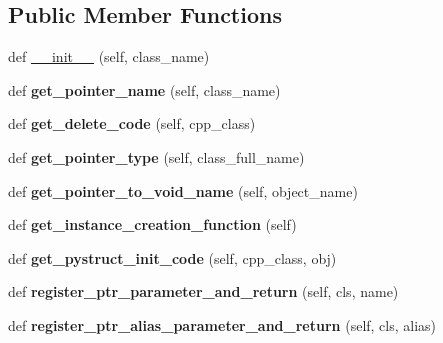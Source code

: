 \subsection*{Public Member Functions}
\begin{DoxyCompactItemize}
\item 
def \hyperlink{classns3__ptr_1_1Ns3PtrMemoryPolicy_aae8674f40d646f4e0a6ff68af5bce543}{\+\_\+\+\_\+init\+\_\+\+\_\+} (self, class\+\_\+name)
\item 
def {\bfseries get\+\_\+pointer\+\_\+name} (self, class\+\_\+name)\hypertarget{classns3__ptr_1_1Ns3PtrMemoryPolicy_a402dc87c812e80777602192e037169c4}{}\label{classns3__ptr_1_1Ns3PtrMemoryPolicy_a402dc87c812e80777602192e037169c4}

\item 
def {\bfseries get\+\_\+delete\+\_\+code} (self, cpp\+\_\+class)\hypertarget{classns3__ptr_1_1Ns3PtrMemoryPolicy_ad4ada9c119ce615fb9deaa1587802504}{}\label{classns3__ptr_1_1Ns3PtrMemoryPolicy_ad4ada9c119ce615fb9deaa1587802504}

\item 
def {\bfseries get\+\_\+pointer\+\_\+type} (self, class\+\_\+full\+\_\+name)\hypertarget{classns3__ptr_1_1Ns3PtrMemoryPolicy_a4878814a772ce27d3fbe36a3739153f9}{}\label{classns3__ptr_1_1Ns3PtrMemoryPolicy_a4878814a772ce27d3fbe36a3739153f9}

\item 
def {\bfseries get\+\_\+pointer\+\_\+to\+\_\+void\+\_\+name} (self, object\+\_\+name)\hypertarget{classns3__ptr_1_1Ns3PtrMemoryPolicy_a49c7e0334aa2233191cea6b12a11d20f}{}\label{classns3__ptr_1_1Ns3PtrMemoryPolicy_a49c7e0334aa2233191cea6b12a11d20f}

\item 
def {\bfseries get\+\_\+instance\+\_\+creation\+\_\+function} (self)\hypertarget{classns3__ptr_1_1Ns3PtrMemoryPolicy_ab9c903d63145409013a1c2cb0dda0ff7}{}\label{classns3__ptr_1_1Ns3PtrMemoryPolicy_ab9c903d63145409013a1c2cb0dda0ff7}

\item 
def {\bfseries get\+\_\+pystruct\+\_\+init\+\_\+code} (self, cpp\+\_\+class, obj)\hypertarget{classns3__ptr_1_1Ns3PtrMemoryPolicy_afaa224d0bb440100320fed71329b2f5b}{}\label{classns3__ptr_1_1Ns3PtrMemoryPolicy_afaa224d0bb440100320fed71329b2f5b}

\item 
def {\bfseries register\+\_\+ptr\+\_\+parameter\+\_\+and\+\_\+return} (self, cls, name)\hypertarget{classns3__ptr_1_1Ns3PtrMemoryPolicy_a4847ee8ce9577b421900f1c0312b72a9}{}\label{classns3__ptr_1_1Ns3PtrMemoryPolicy_a4847ee8ce9577b421900f1c0312b72a9}

\item 
def {\bfseries register\+\_\+ptr\+\_\+alias\+\_\+parameter\+\_\+and\+\_\+return} (self, cls, alias)\hypertarget{classns3__ptr_1_1Ns3PtrMemoryPolicy_a462b1986f44c7d893bccd8076e5849ae}{}\label{classns3__ptr_1_1Ns3PtrMemoryPolicy_a462b1986f44c7d893bccd8076e5849ae}

\end{DoxyCompactItemize}
